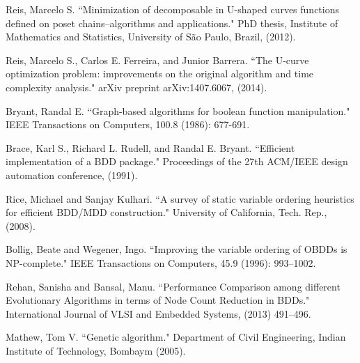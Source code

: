 \documentclass[12pt]{article}
\begin{document}
\begin{thebibliography}{9} \label{sec:referencias}


Reis, Marcelo S. ``Minimization of decomposable in U-shaped curves functions defined on poset chains–algorithms and applications." PhD thesis, Institute of Mathematics and Statistics, University of São Paulo, Brazil, (2012).

Reis, Marcelo S., Carlos E. Ferreira, and Junior Barrera. ``The U-curve optimization problem: improvements on the original algorithm and time complexity analysis." arXiv preprint arXiv:1407.6067, (2014). 


Bryant, Randal E. ``Graph-based algorithms for boolean function manipulation." IEEE Transactions on Computers, 100.8 (1986): 677-691. 

Brace, Karl S., Richard L. Rudell, and Randal E. Bryant. ``Efficient implementation of a BDD package." Proceedings of the 27th ACM/IEEE design automation conference, (1991). 


Rice, Michael and Sanjay Kulhari. ``A survey of static variable ordering heuristics for efficient BDD/MDD construction." University of California, Tech. Rep., (2008).

Bollig, Beate and Wegener, Ingo. ``Improving the variable ordering of OBDDs is NP-complete." IEEE Transactions on Computers, 45.9 (1996): 993--1002.

Rehan, Sanisha and Bansal, Manu. ``Performance Comparison among different Evolutionary Algorithms in terms of Node Count Reduction in BDDs." International Journal of VLSI and Embedded Systems, (2013) 491--496.

Mathew, Tom V. ``Genetic algorithm." Department of Civil Engineering, Indian Institute of Technology, Bombaym (2005).



\end{thebibliography}
\end{document}
